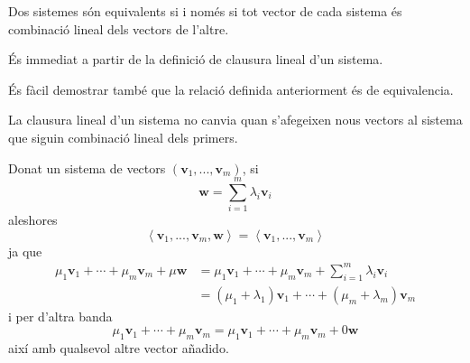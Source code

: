 \begin{teorema}
Dos sistemes són equivalents si i només si tot vector de cada sistema
és combinació lineal dels vectors de l'altre.

\end{teorema}
\begin{prova}
És immediat a partir de la definició de clausura lineal d’un sistema.
\end{prova}

\begin{observacio}
És fàcil demostrar també que la relació definida
anteriorment és de equivalencia.
\end{observacio}

\begin{teorema}
La clausura lineal d’un sistema no canvia quan s'afegeixen nous
vectors al sistema que siguin combinació lineal dels primers.

\end{teorema}
\begin{prova}
Donat un sistema de vectors $(\mathbf{v}_{1},...,\mathbf{v}_{m})$, si 
\begin{equation*}
\mathbf{w}=\sum_{i=1}^{m}\lambda _{i}\mathbf{v}_{i}
\end{equation*}%
aleshores%
\begin{equation*}
\left\langle \mathbf{v}_{1},...,\mathbf{v}_{m},\mathbf{w}\right\rangle
=\left\langle \mathbf{v}_{1},...,\mathbf{v}_{m}\right\rangle
\end{equation*}%
ja que%
\begin{align*}
\mu _{1}\mathbf{v}_{1}+\cdots +\mu _{m}\mathbf{v}_{m}+\mu \mathbf{w} &=\mu
_{1}\mathbf{v}_{1}+\cdots +\mu _{m}\mathbf{v}_{m}+\sum_{i=1}^{m}\lambda _{i}%
\mathbf{v}_{i} \\
&=\left( \mu _{1}+\lambda _{1}\right) \mathbf{v}_{1}+\cdots +\left( \mu
_{m}+\lambda _{m}\right) \mathbf{v}_{m}
\end{align*}%
i per d’altra banda 
\begin{equation*}
\mu _{1}\mathbf{v}_{1}+\cdots +\mu _{m}\mathbf{v}_{m}=\mu _{1}\mathbf{v}%
_{1}+\cdots +\mu _{m}\mathbf{v}_{m}+0\mathbf{w}
\end{equation*}%
així amb qualsevol altre vector añadido.
\end{prova}

